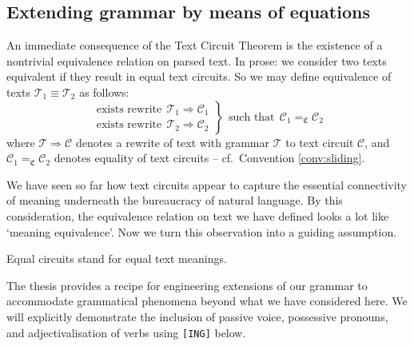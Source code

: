 \subsection{Extending grammar by means of equations}

An immediate consequence of the Text Circuit Theorem is the existence of a nontrivial equivalence relation on parsed text. In prose: we consider two texts equivalent if they result in equal text circuits.  So we may define  equivalence of texts $\mathcal{T}_1 \equiv \mathcal{T}_2$ as follows:
\[
\left.\begin{array}{c}
\mbox{exists rewrite}\ \  \mathcal{T}_1 \Rightarrow \mathcal{C}_1\\ 
\mbox{exists rewrite}\ \  \mathcal{T}_2 \Rightarrow \mathcal{C}_2 
\end{array}\right\} \ \ \mbox{such that}\ \  \mathcal{C}_1 =_{\mathfrak{C}} \mathcal{C}_2  
\] 
where $\mathcal{T} \Rightarrow \mathcal{C}$ denotes a rewrite of text with grammar $\mathcal{T}$ to text circuit $\mathcal{C}$, and $\mathcal{C}_1 =_{\mathfrak{C}} \mathcal{C}_2$ denotes equality of text circuits -- cf.~Convention \ref{conv:sliding}.

We have seen so far how text circuits appear to capture the essential connectivity of meaning underneath the bureaucracy of natural language. By this consideration, the equivalence relation on text we have defined looks a lot like `meaning equivalence'. Now we turn this observation into a guiding assumption.

\begin{thesis}
Equal circuits stand for equal text meanings. 
\end{thesis}
 
The thesis provides a recipe for engineering extensions of our grammar  
to accommodate grammatical phenomena beyond what we have considered here. We will explicitly demonstrate the inclusion of passive voice, possessive pronouns, and adjectivalisation of verbs using \texttt{[ING]} below. 

